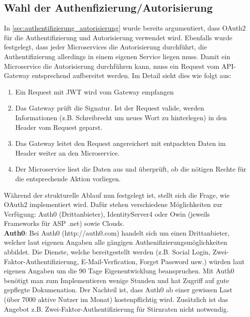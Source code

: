 {\subsection{Wahl der Authenfizierung/Autorisierung} \label{sec:concept_authentifizierung_autorisierung}

In \ref{sec:authentifizierung_autorisierung} wurde bereits argumentiert, dass OAuth2 für die Authentifizierung und Autorisierung verwendet wird. Ebenfalls wurde festgelegt, dass jeder Microservices die Autorisierung durchführt, die Authentifizierung allerdings in einem eigenen Service liegen muss. Damit ein Microservice die Autorisierung durchführen kann, muss ein Request vom API-Gateway entsprechend aufbereitet werden. Im Detail sieht dies wie folgt aus\cite{richardson2019mic_pattern}:\\
\begin{enumerate}
	\item  Ein Request mit JWT wird vom Gateway empfangen
	\item Das Gateway prüft die Signatur. Ist der Request valide, werden Informationen (z.B. Schreibrecht um neues Wort zu hinterlegen) in den Header vom Request geparst. 
	\item Das Gateway leitet den Request angereichert mit entpackten Daten im Header weiter an den Microservice.
	\item Der Microservice liest die Daten aus und überprüft, ob die nötigen Rechte für die entsprechende Aktion vorliegen.
\end{enumerate}

Während der strukturelle Ablauf nun festgelegt ist, stellt sich die Frage, wie OAuth2 implementiert wird. Dafür stehen verschiedene Möglichkeiten zur Verfügung: Auth0 (Drittanbieter), IdentityServer4 oder Owin (jeweils Frameworks für ASP .net) sowie Clouds.\\

\textbf{Auth0}: Bei Auth0 (http://auth0.com) handelt sich um einen Drittanbieter, welcher laut eigenen Angaben alle gängigen Authenifizierungsmöglichkeiten abbildet. Die Dienste, welche bereitgestellt werden (z.B. Social Login, Zwei-Faktor-Authentifizierung, E-Mail-Verfication, Forget Password usw.) würden laut eigenen Angaben um die 90 Tage Eigenentwicklung beanspruchen. Mit Auth0 benötigt man zum Implementieren wenige Stunden und hat Zugriff auf gute gepflegte Dokumenation. Der Nachteil ist, dass Auth0 ab einer gewissen Last (über 7000 aktive Nutzer im Monat) kostenpflichtig wird. Zusätzlich ist das Angebot z.B. Zwei-Faktor-Authentifizierung für Stirnraten nicht notwendig.\\

}
